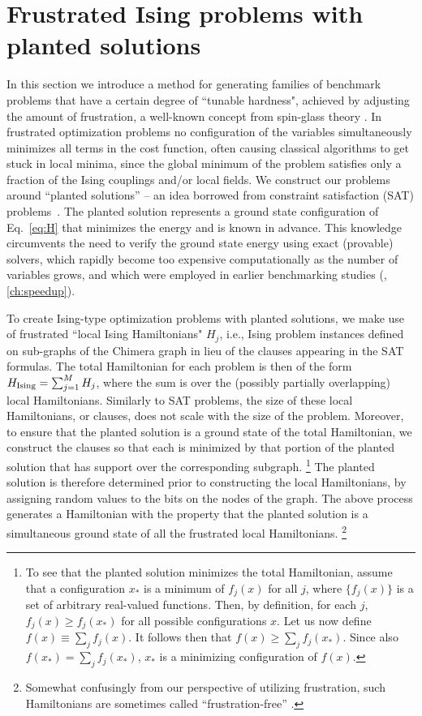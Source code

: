 \section{Frustrated Ising problems with planted solutions}
\label{sec:II}
%

In this section we introduce a method for generating families of benchmark problems that have a certain degree of ``tunable hardness", achieved by adjusting the amount of frustration, a well-known concept from spin-glass theory \cite{Parisi:book}.  In frustrated optimization problems no configuration of the variables simultaneously minimizes all terms in the cost function, often causing classical algorithms to get stuck in local minima, since the global minimum of the problem satisfies only a fraction of the Ising couplings and/or local fields. We construct our problems around ``planted solutions'' -- an idea borrowed from constraint satisfaction (SAT) problems~\cite{Barthel:2002tw,Krzakala:2009qo}. The planted solution represents a ground state configuration of Eq.~\eqref{eq:H} that minimizes the energy and is known in advance. This knowledge circumvents the need to verify the ground state energy using exact (provable) solvers, which rapidly become too expensive computationally as the number of variables grows, and which were employed in earlier benchmarking studies (\cite{q108,speedup},\ref{ch:speedup}).

To create Ising-type optimization problems with planted solutions, we make use of frustrated ``local Ising Hamiltonians" $H_j$, i.e., Ising problem instances defined on sub-graphs of the Chimera graph in lieu of the clauses appearing in the SAT formulas. The total Hamiltonian for each problem is then of the form $H_{\textrm{Ising}} = \sum_{j=1}^M H_j$, where the sum is over the (possibly partially overlapping) local Hamiltonians.  Similarly to SAT problems, the size of these local Hamiltonians, or clauses, does not scale with the size of the problem. Moreover, to ensure that the planted solution is a ground state of the total Hamiltonian, we construct the clauses so that each is minimized by that portion of the planted solution that has support over the corresponding subgraph.%
\footnote{To see that the planted solution minimizes the total Hamiltonian, assume that a configuration $x_*$ is a minimum of $f_j(x)$ for all $j$, where $\{f_j(x)\}$ is a set of arbitrary real-valued functions. Then, by definition, for each $j$, $f_j(x)\geq f_j(x_*)$ for all possible configurations $x$. Let us now define $f(x) \equiv \sum_j f_j(x)$. It follows then that $f(x) \geq \sum_j f_j(x_*)$. Since also $f(x_*) = \sum_j f_j(x_*)$, $x_*$ is a minimizing configuration of $f(x)$.}
The planted solution is therefore determined prior to constructing the local Hamiltonians, by assigning random values to the bits on the nodes of the graph. The above process generates a Hamiltonian with the property that the planted solution is a simultaneous ground state of all the frustrated local Hamiltonians.%
\footnote{Somewhat confusingly from our perspective of utilizing frustration, such Hamiltonians are sometimes called ``frustration-free'' \cite{Bravyi:2009sp}.}

